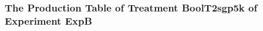  \begin{frame}
 \fontsize{8pt}{9pt}\selectfont
 \frametitle{ The Production Table of Treatment BoolT2sgp5k of Experiment ExpB }

 \label{ExpBGrammarTable015.tex}  
 \end{frame}

